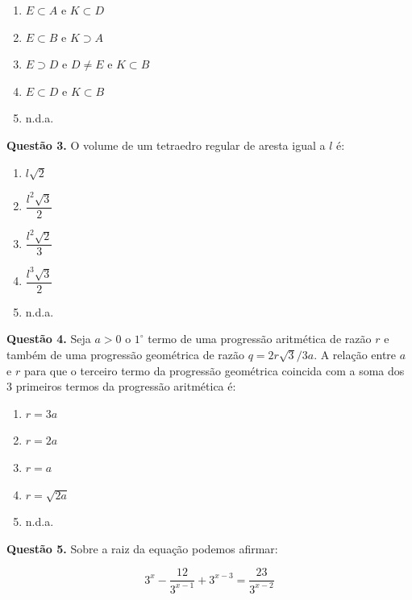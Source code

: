 \documentclass[11pt]{article}
\begin{document}
\begin{multicols}{3}
\begin{enumerate}[\bf A (\quad)]
    \item $E \subset A$ e $K \subset D$
    \item $E \subset B$ e $K \supset A$
    \item $E \supset D$ e $D \neq E$ e $K \subset B$
    \item $E \subset D$ e $K \subset B$
    \item n.d.a.
\end{enumerate}
\end{multicols}


\textbf{Questão 3.} O volume de um tetraedro regular de aresta igual a $l$ é: 

\begin{multicols}{2}
    \begin{enumerate}[\bf A (\quad)]
        \item $l \sqrt{2}$
        \item $\dfrac{l^2 \sqrt{3}}{2}$
        \item $\dfrac{l^2 \sqrt{2}}{3}$
        \item $\dfrac{l^3 \sqrt{3}}{2}$
        \item n.d.a.
    \end{enumerate}
\end{multicols}

\textbf{Questão 4.} Seja $a > 0$ o $1^{\circ}$ termo de uma progressão aritmética de razão $r$ e também de uma progressão geométrica de razão $q = 2r \sqrt{3}/3a$.  A  relação  entre  $a$  e  $r$  para  que  o  terceiro  termo da progressão geométrica coincida com a soma dos 3 primeiros termos da progressão aritmética é: 

\begin{multicols}{5}
\begin{enumerate}[\bf A (\quad)]
    \item $r = 3a$
    \item $r = 2a$
    \item $r = a$
    \item $r =\sqrt{2a}$
    \item n.d.a.
\end{enumerate}
\end{multicols}

\textbf{Questão 5.} Sobre a raiz da equação podemos afirmar: 

\[
3^x - \frac{12}{3^{x-1}} + 3^{x-3} = \frac{23}{3^{x-2}}
\]
\end{document}

